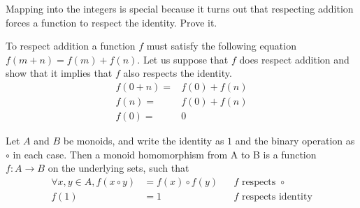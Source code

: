\begin{ttta}
Mapping into the integers is special because it turns out that respecting
addition forces a function to respect the identity. Prove it.
\end{ttta}
\begin{proofitem}
\item To respect addition a function $f$ must satisfy the following equation $f(m+n) =
f(m)+f(n)$.  Let us suppose that $f$ does respect addition and show that it
implies that $f$ also respects the identity.
\begin{align*}
    f(0+n) =& f(0) + f(n)\\
    f(n) =& f(0) + f(n)\\
    f(0) =& 0
\end{align*}
\end{proofitem}
\begin{definition}
Let $A$ and $B$ be monoids, and write the identity as $1$ and the
binary operation as $\circ$ in each case. Then a monoid homomorphism from A to
B is a function $f:A\rightarrow B$ on the underlying sets, such that
\begin{align*}
    \forall x, y \in A, f(x \circ y) &= f(x) \circ f(y)&&f\text{ respects }\circ\\
    f(1)&=1&&f\text{ respects identity}
\end{align*}
\end{definition}

